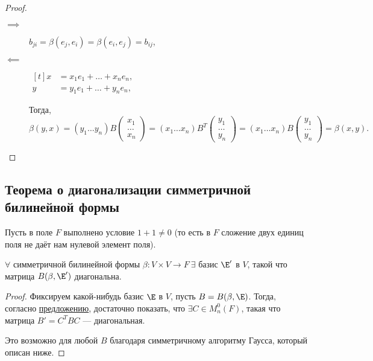 \begin{proof}~
    \begin{description}
    \item[$\implies$] $b_{ji} = \beta(e_j, e_i) = \beta(e_i, e_j) = b_{ij}$, 
    \item[$\impliedby$] 
        \begin{math}
            \begin{aligned}[t]
                x &= x_1 e_1 + \dots + x_n e_n, \\
                y &= y_1 e_1 + \dots + y_n e_n,
            \end{aligned}
        \end{math}

        Тогда, 
        \begin{equation*}
            \beta(y, x) = (y_1 \dots y_n) B \begin{pmatrix} x_1 \\ \dots \\ x_n \end{pmatrix} = (x_1 \dots x_n) B^{T} \begin{pmatrix} y_1 \\ \dots \\ y_n \end{pmatrix} = (x_1 \dots x_n) B \begin{pmatrix} y_1 \\ \dots \\ y_n \end{pmatrix} = \beta(x, y)
        .\end{equation*}
    \end{description}
\end{proof}

\subsection{Теорема о диагонализации симметричной билинейной формы}

Пусть в поле $F$ выполнено условие $1 + 1 \neq 0$ (то есть в $F$ сложение двух единиц поля не даёт нам нулевой элемент поля).

\begin{theorem}
    $\forall$ симметричной билинейной формы $\beta \colon V \times V \to F \ \exists$ базис $\E'$ в $V$, такой что матрица $B (\beta, \E')$ диагональна.
\end{theorem}

\begin{proof}
    Фиксируем какой-нибудь базис $\E$ в $V$, пусть $B = B(\beta, \E)$. Тогда, согласно \hyperref[lec19:bilinear_basis_change]{предложению}, достаточно показать, что $\exists C \in M^{0}_n (F)$, такая что матрица $B' = C^{T} B C$ --- диагональная.

    Это возможно для любой $B$ благодаря симметричному алгоритму Гаусса, который описан ниже.
\end{proof}

